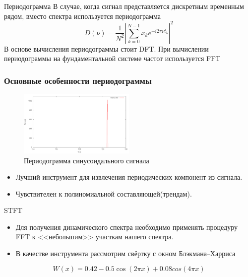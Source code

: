 \documentclass[11pt,slides,aspectratio=43]{beamer}%
\begin{document}
    \begin{frame}{Периодограмма}
    В случае, когда сигнал представляется дискретным временным рядом, вместо спектра используется периодограмма
    $$
        D(\nu) = \frac{1}{N^{2}}\left|\sum\limits_{k = 0}^{N - 1} x_{k} e^{-i 2 \pi \nu t_{k}} \right|^{2}
    $$
    В основе вычисления периодограммы стоит DFT.
    \vskip2pt
    При вычислении периодограммы на фундаментальной системе частот используется FFT
    \end{frame}

    \begin{frame}
	\frametitle{Основные особенности периодограммы}
        \begin{figure}[h!]
            \begin{center}
                \includegraphics[width = 0.5\textwidth]{spec1.png}
                \caption{Периодограмма синусоидального сигнала}
            \end{center}
        \end{figure}
	   \begin{block}{}
            \begin{itemize}
	           \item Лучший инструмент для извлечения периодических компонент из сигнала.
	           \item Чувствителен к полиномиальной составляющей(трендам).
            \end{itemize}
		\end{block}
	\end{frame}

    \begin{frame}{STFT}
        \begin{itemize}
	           \item Для получения динамического спектра необходимо применять процедуру FFT к <<небольшим>> участкам нашего спектра.
	           \item В качестве инструмента рассмотрим свёртку с окном Блэкмана--Харриса
        \end{itemize}

        $$
            W(x) = 0.42 - 0.5 \cos(2 \pi x) + 0.08 cos(4 \pi x)
        $$

    \end{frame}
\end{document}
